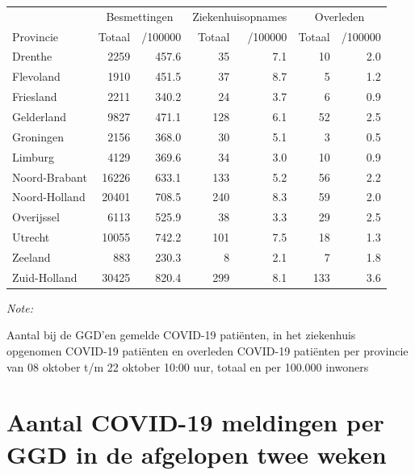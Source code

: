 \documentclass[
  english,
  man,floatsintext]{apa6}
\begin{document}
\begin{table}[H]
\centering
\begin{threeparttable}
\begin{tabular}{lrrrrrr}
\toprule
\multicolumn{1}{c}{ } & \multicolumn{2}{c}{Besmettingen} & \multicolumn{2}{c}{Ziekenhuisopnames} & \multicolumn{2}{c}{Overleden} \\
\cmidrule(l{3pt}r{3pt}){2-3} \cmidrule(l{3pt}r{3pt}){4-5} \cmidrule(l{3pt}r{3pt}){6-7}
Provincie & Totaal & /100000 & Totaal & /100000 & Totaal & /100000\\
\midrule
Drenthe & 2259 & 457.6 & 35 & 7.1 & 10 & 2.0\\
Flevoland & 1910 & 451.5 & 37 & 8.7 & 5 & 1.2\\
Friesland & 2211 & 340.2 & 24 & 3.7 & 6 & 0.9\\
Gelderland & 9827 & 471.1 & 128 & 6.1 & 52 & 2.5\\
Groningen & 2156 & 368.0 & 30 & 5.1 & 3 & 0.5\\
Limburg & 4129 & 369.6 & 34 & 3.0 & 10 & 0.9\\
Noord-Brabant & 16226 & 633.1 & 133 & 5.2 & 56 & 2.2\\
Noord-Holland & 20401 & 708.5 & 240 & 8.3 & 59 & 2.0\\
Overijssel & 6113 & 525.9 & 38 & 3.3 & 29 & 2.5\\
Utrecht & 10055 & 742.2 & 101 & 7.5 & 18 & 1.3\\
Zeeland & 883 & 230.3 & 8 & 2.1 & 7 & 1.8\\
Zuid-Holland & 30425 & 820.4 & 299 & 8.1 & 133 & 3.6\\
\bottomrule
\end{tabular}
\begin{tablenotes}
\item \textit{Note: } 
\item Aantal bij de GGD’en gemelde COVID-19 patiënten, in het ziekenhuis opgenomen COVID-19 patiënten en overleden COVID-19 patiënten per provincie van 08 oktober t/m 22 oktober 10:00 uur, totaal en per 100.000 inwoners
\end{tablenotes}
\end{threeparttable}
\end{table}

\newpage

\hypertarget{aantal-covid-19-meldingen-per-ggd-in-de-afgelopen-twee-weken}{%
\section{Aantal COVID-19 meldingen per GGD in de afgelopen twee weken}\label{aantal-covid-19-meldingen-per-ggd-in-de-afgelopen-twee-weken}}
\end{document}
